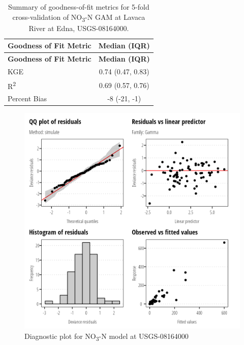 \documentclass[
]{article}
\begin{document}
\hypertarget{tbl-NO308164000-CV}{}
\begin{longtable}[]{@{}lc@{}}
\caption{\label{tbl-NO308164000-CV}Summary of goodness-of-fit metrics
for 5-fold cross-validation of NO\textsubscript{3}-N GAM at Lavaca River
at Edna, USGS-08164000.}\tabularnewline
\toprule()
\textbf{Goodness of Fit Metric} & \textbf{Median (IQR)} \\
\midrule()
\endfirsthead
\toprule()
\textbf{Goodness of Fit Metric} & \textbf{Median (IQR)} \\
\midrule()
\endhead
KGE & 0.74 (0.47, 0.83) \\
R\textsuperscript{2} & 0.69 (0.57, 0.76) \\
Percent Bias & -8 (-21, -1) \\
\bottomrule()
\end{longtable}

\clearpage

\begin{figure}[h]

{\centering \includegraphics{model_assessment_files/figure-pdf/unnamed-chunk-4-1.png}

}

\caption{Diagnostic plot for NO\textsubscript{3}-N model at
USGS-08164000}

\end{figure}
\end{document}
